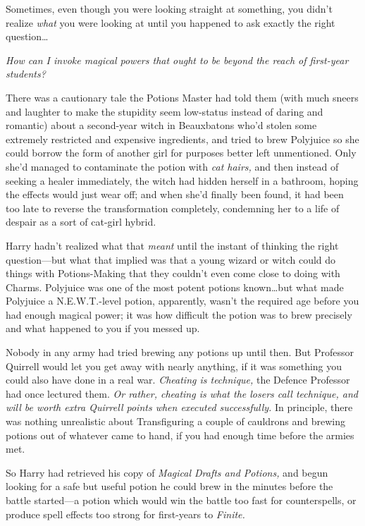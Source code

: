 Sometimes, even though you were looking straight at something, you didn’t
realize \emph{what} you were looking at until you happened to ask exactly the
right question…

\emph{How can I invoke magical powers that ought to be beyond the reach of
first-year students?}

There was a cautionary tale the Potions Master had told them (with much sneers
and laughter to make the stupidity seem low-status instead of daring and
romantic) about a second-year witch in Beauxbatons who’d stolen some extremely
restricted and expensive ingredients, and tried to brew Polyjuice so she could
borrow the form of another girl for purposes better left unmentioned. Only
she’d managed to contaminate the potion with \emph{cat hairs,} and then instead
of seeking a healer immediately, the witch had hidden herself in a bathroom,
hoping the effects would just wear off; and when she’d finally been found, it
had been too late to reverse the transformation completely, condemning her to a
life of despair as a sort of cat-girl hybrid.

Harry hadn’t realized what that \emph{meant} until the instant of thinking the
right question—but what that implied was that a young wizard or witch could
do things with Potions-Making that they couldn’t even come close to doing with
Charms. Polyjuice was one of the most potent potions known…but what
made Polyjuice a N.E.W.T.-level potion, apparently, wasn’t the required age
before you had enough magical power; it was how difficult the potion was to
brew precisely and what happened to you if you messed up.

Nobody in any army had tried brewing any potions up until then. But Professor
Quirrell would let you get away with nearly anything, if it was something you
could also have done in a real war. \emph{Cheating is technique,} the Defence
Professor had once lectured them. \emph{Or rather, cheating is what the losers
call technique, and will be worth extra Quirrell points when executed
successfully.} In principle, there was nothing unrealistic about Transfiguring
a couple of cauldrons and brewing potions out of whatever came to hand, if you
had enough time before the armies met.

So Harry had retrieved his copy of \emph{Magical Drafts and Potions,} and begun
looking for a safe but useful potion he could brew in the minutes before the
battle started—a potion which would win the battle too fast for
counterspells, or produce spell effects too strong for first-years to
\emph{Finite.}

